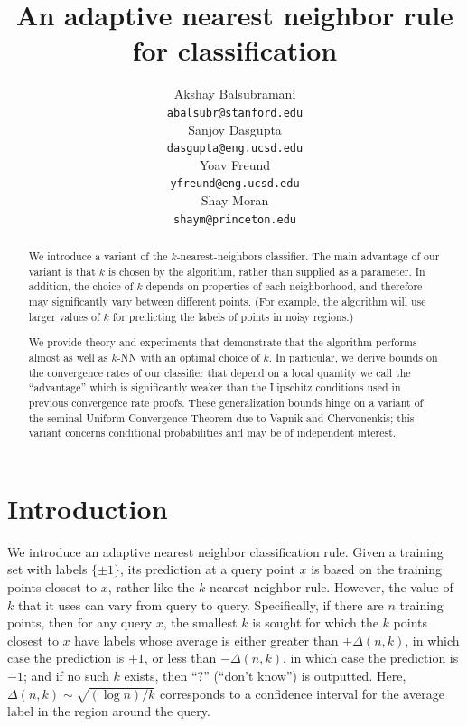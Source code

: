 \documentclass{article}
\title{An adaptive nearest neighbor rule for classification}
\author{
Akshay Balsubramani \\
\texttt{abalsubr@stanford.edu} \\
\And
Sanjoy Dasgupta \\
\texttt{dasgupta@eng.ucsd.edu} \\
\And
Yoav Freund \\
\texttt{yfreund@eng.ucsd.edu} \\
\And
Shay Moran\\
\texttt{shaym@princeton.edu} \\
}
\begin{document}
\maketitle

\begin{abstract}
We introduce a variant of the $k$-nearest-neighbors classifier. The main advantage of our variant is that $k$ is chosen by the algorithm, rather than supplied as a parameter. In addition, the choice of $k$ depends on properties of each neighborhood, and therefore may significantly vary between different points. (For example, the algorithm will use larger values of $k$ for predicting the labels of points in noisy regions.)  

We provide theory and experiments that demonstrate that the algorithm performs almost as well as $k$-NN with an optimal choice of $k$. In particular, we derive bounds on the convergence rates of our classifier that depend on a local quantity we call the ``advantage'' which is significantly weaker than the Lipschitz conditions used in previous convergence rate proofs. These generalization bounds hinge on a variant of the seminal Uniform Convergence Theorem due to Vapnik and Chervonenkis; this variant concerns conditional probabilities and may be of independent interest. 
\end{abstract}

\section{Introduction}

We introduce an adaptive nearest neighbor classification rule. Given a
training set with labels $\{\pm 1\}$, its prediction at a query point $x$ is based on the training points closest to $x$, rather like
the $k$-nearest neighbor rule. However, the value of $k$ that it uses
can vary from query to query. Specifically, if there are $n$ training
points, then for any query $x$, the smallest $k$ is sought for which
the $k$ points closest to $x$ have labels whose average is either
greater than $+\Delta(n,k)$, in which case the prediction is $+1$, or
less than $- \Delta(n,k)$, in which case the prediction is $-1$; and
if no such $k$ exists, then ``?'' (``don't know'') is outputted.  
Here, $\Delta(n,k) \sim \sqrt{(\log n)/k}$ corresponds to a confidence interval for the average label in the region around the query.
\end{document}
